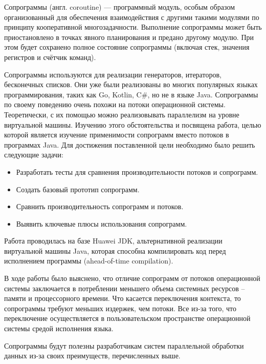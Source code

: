 
Сопрограммы (англ. coroutine) — программный модуль, особым образом организованный для
обеспечения взаимодействия с другими такими модулями по принципу кооперативной
многозадачности\cite{coroutine}. Выполнение сопрограммы может быть
приостановлено в точках явного планирования и предано другому модулю. 
При этом будет сохранено полное состояние сопрограммы (включая стек, значения регистров и счётчик команд). 

\par
Сопрограммы используются для реализации генераторов, итераторов, бесконечных списков. 
Они уже были реализованы во многих популярных языках программирования, таких как Go, Kotlin,
C\#, но не в языке Java. Сопрограммы по своему поведению очень похожи на потоки
операционной системы.
Теоретически, с их помощью можно реализовывать параллелизм на уровне виртуальной машины.
Изучению этого обстоятельства и посвящена работа, целью которой является изучение
применимости сопрограмм вместо потоков в программах Java.
Для достижения поставленной цели необходимо было решить следующие задачи:
\begin{itemize}
	\item Разработать тесты для сравнения производительности потоков и сопрограмм.
	\item Создать базовый прототип сопрограмм.
	\item Сравнить производительность сопрограмм и потоков.
	\item Выявить ключевые плюсы использования сопрограмм.
\end{itemize}
Работа проводилась на базе Huawei JDK, альтернативной реализации виртуальной машины Java, которая способна компилировать код перед исполнением программы (ahead-of-time compilation). 
\par
В ходе работы было выяснено, что отличие сопрограмм от потоков операционной системы
заключается в потреблении меньшего объема системных ресурсов – памяти и процессорного времени.
Что касается переключения контекста, то сопрограммы требуют меньших издержек, чем
потоки. Все из-за того, что переключение осуществляется в пользовательском пространстве
операционной системы средой исполнения языка. 
\par
Сопрограммы будут полезны разработчикам систем параллельной обработки данных из-за своих преимуществ, перечисленных выше.
\clearpage

